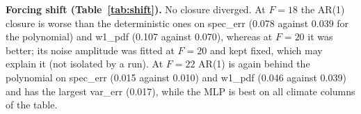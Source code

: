 \textbf{Forcing shift (Table~\ref{tab:shift}).} No closure diverged. At $F{=}18$ the AR(1) closure is worse than the deterministic ones on spec\_err (0.078 against 0.039 for the polynomial) and w1\_pdf (0.107 against 0.070), whereas at $F{=}20$ it was better; its noise amplitude was fitted at $F{=}20$ and kept fixed, which may explain it (not isolated by a run). At $F{=}22$ AR(1) is again behind the polynomial on spec\_err (0.015 against 0.010) and w1\_pdf (0.046 against 0.039) and has the largest var\_err (0.017), while the MLP is best on all climate columns of the table.
